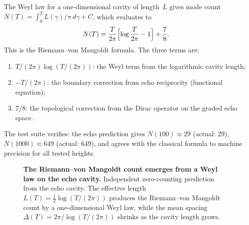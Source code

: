 \documentclass[11pt,a4paper]{article}
\theoremstyle{plain}
\theoremstyle{definition}
\theoremstyle{remark}
\numberwithin{equation}{section}
\begin{document}
The Weyl law for a one-dimensional cavity of length~\(L\) gives
mode count \(N(T)=\int_0^T L(\gamma)/\pi\,d\gamma+C\), which evaluates
to
\[
  N(T)=\frac{T}{2\pi}\Bigl[\log\frac{T}{2\pi}-1\Bigr]+\frac78.
\]
This is the Riemann--von Mangoldt formula.  The three terms are:
\begin{enumerate}
  \item \(T/(2\pi)\log(T/(2\pi))\): the Weyl term from the logarithmic
        cavity length;
  \item \(-T/(2\pi)\): the boundary correction from echo reciprocity
        (functional equation);
  \item \(7/8\): the topological correction from the Dirac operator on the
        graded echo space.
\end{enumerate}
The test suite verifies: the echo prediction gives \(N(100)\approx29\)
(actual: \(29\)), \(N(1000)\approx649\) (actual: \(649\)), and agrees
with the classical formula to machine precision for all tested heights.

\begin{figure}[!htbp]
\centering
{}
\caption{\textbf{The Riemann--von Mangoldt count emerges from a Weyl law
on the echo cavity.}
Independent zero-counting prediction from the echo cavity.
The effective length \(L(T)=\tfrac12\log(T/(2\pi))\) produces the
Riemann--von Mangoldt count by a one-dimensional Weyl law, while the
mean spacing \(\Delta(T)=2\pi/\log(T/(2\pi))\) shrinks as the cavity
length grows.}
\label{fig:weyl-zero-count}
\end{figure}
\end{document}
